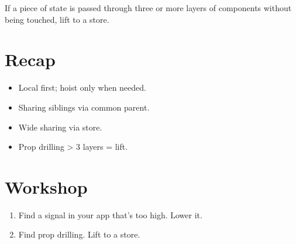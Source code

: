 If a piece of state is passed through three or more layers
of components without being touched, lift to a store.

\section{Recap}

\begin{recap}
\begin{itemize}[leftmargin=*]
  \item Local first; hoist only when needed.
  \item Sharing siblings via common parent.
  \item Wide sharing via store.
  \item Prop drilling > 3 layers = lift.
\end{itemize}
\end{recap}

\section*{Workshop}

\begin{enumerate}[leftmargin=*]
  \item Find a signal in your app that's too high.
    Lower it.
  \item Find prop drilling. Lift to a store.
\end{enumerate}
